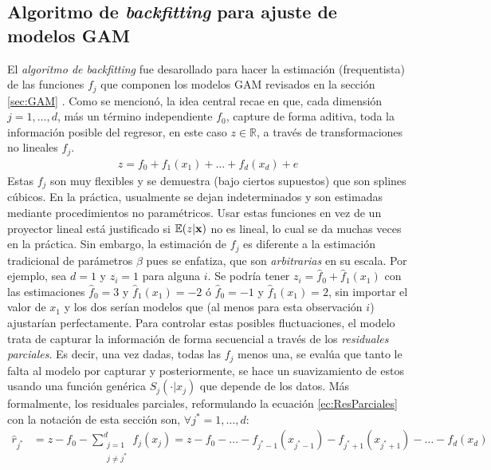 \documentclass[../Main/Main.tex]{subfiles}
\begin{document}
\subsection{Algoritmo de \textit{backfitting} para ajuste de modelos GAM} \label{sec:AlgoBackfitting}
El \textit{algoritmo de backfitting} fue desarollado para hacer la estimación (frequentista) de las funciones $f_j$ que componen los modelos GAM revisados en la sección \ref{sec:GAM} \autocite{hastie1986generalized}. Como se mencionó, la idea central recae en que, cada dimensión $j = 1,\ldots,d$, más un término independiente $f_0$, capture de forma aditiva, toda la información posible del regresor, en este caso $z\in\mathbb{R}$, a través de transformaciones no lineales $f_j$. 
\begin{align}
	z = f_0 + f_1(x_1) + \ldots + f_d(x_d) + e \label{ec:GAM}
\end{align}
Estas $f_j$ son muy flexibles y se demuestra (bajo ciertos supuestos) que son splines cúbicos. En la práctica, usualmente se dejan indeterminados y son estimadas mediante procedimientos no paramétricos. Usar estas funciones en vez de un proyector lineal está justificado si $\mathbb{E}(z|\mathbf{x})$ no es lineal, lo cual se da muchas veces en la práctica. Sin embargo, la estimación de $f_j$ es diferente a la estimación tradicional de parámetros $\beta$ pues se enfatiza, que son \textit{arbitrarias} en su escala. Por ejemplo, sea $d = 1$ y $z_i = 1$ para alguna $i$. Se podría tener $z_i = \hat{f}_0 + \hat{f}_1(x_1)$  con las estimaciones $\hat{f}_0 = 3$ y $\hat{f}_1(x_1) = -2$ ó $\hat{f}_0 = -1$ y $\hat{f}_1(x_1) = 2$, sin importar el valor de $x_1$ y los dos serían modelos que (al menos para esta observación $i$) ajustarían perfectamente. Para controlar estas posibles fluctuaciones, el modelo trata de capturar la información de forma secuencial a través de los \textit{residuales parciales}. Es decir, una vez dadas, todas las $f_j$ menos una, se evalúa que tanto le falta al modelo por capturar y posteriormente, se hace un suavizamiento de estos usando una función genérica $S_j(\cdot|x_j)$ que depende de los datos. Más formalmente, los residuales parciales, reformulando la ecuación \ref{ec:ResParciales} con la notación de esta sección son, $\forall j^*=1,\ldots,d$:
\begin{align}
	\hat{r}_{j^*} &= z - f_0 - \sum_{\substack{j=1\\ j \neq j^*}}^d f_j(x_j) = z - f_0 -  \ldots - f_{j^*-1}(x_{j^*-1}) - f_{j^*+1}(x_{j^*+1}) - \ldots - f_d(x_d)  \label{ec:ResParciales2}
\end{align}
\end{document}
